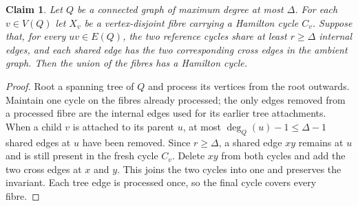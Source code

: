 \documentclass[11pt]{article}
\newtheorem{claim}{Claim}
\theoremstyle{remark}
\numberwithin{equation}{section}
\numberwithin{table}{section}
\begin{document}
\begin{claim}\label{lem:protected-tree-splicing}
Let $Q$ be a connected graph of maximum degree at most $\Delta$.  For
each $v\in V(Q)$ let $X_v$ be a vertex-disjoint fibre carrying a
Hamilton cycle $C_v$.  Suppose that, for every $uv\in E(Q)$, the two
reference cycles share at least $r\ge\Delta$ internal edges, and
each shared edge has the two corresponding cross edges in the ambient
graph.  Then the union of the fibres has a Hamilton cycle.
\end{claim}
\begin{proof}
Root a spanning tree of $Q$ and process its vertices from the root
outwards.  Maintain one cycle on the fibres already processed; the
only edges removed from a processed fibre are the internal edges used
for its earlier tree attachments.  When a child $v$ is attached to
its parent $u$, at most $\deg_Q(u)-1\le\Delta-1$ shared edges at $u$
have been removed.  Since $r\ge\Delta$, a shared edge $xy$ remains
at $u$ and is still present in the fresh cycle $C_v$.  Delete $xy$
from both cycles and add the two cross edges at $x$ and $y$.  This
joins the two cycles into one and preserves the invariant.  Each
tree edge is processed once, so the final cycle covers every fibre.
\end{proof}
\end{document}
